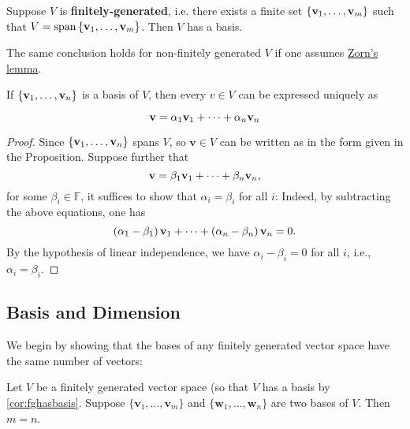 \begin{corollary} \label{cor:fghasbasis}
Suppose \(V\) is {\bf finitely-generated}, i.e. there exists a finite set $\{{\bf v}_1,\ldots ,{\bf v}_{m}\}$ such that $V = \operatorname{span}\left\{{\bf v}_1,\ldots ,{\bf v}_{m}\right\}$.
Then \(V\) has a basis. 
\end{corollary}
The same conclusion holds for non-finitely generated \(V\) if one assumes \href{https://en.wikipedia.org/wiki/Zorn%27s_lemma}{Zorn's lemma}.


\begin{proposition} If \(\left\{  {{\bf v}_1,\ldots ,{\bf v}_n}\right\}\) is a basis of \(V\), then every \(v \in  V\) can be expressed uniquely as

\[
\mathbf{v} = \alpha_1{\bf v}_1 + \cdots  + \alpha_n{\bf v}_n
\]
\end{proposition}

\begin{proof} Since \(\left\{  {{\bf v}_1,\ldots ,{\bf v}_n}\right\}\) spans \(V\), so \(\mathbf{v} \in  V\) can be written as in the form given in the Proposition.
Suppose further that
\[
\mathbf{v} = \beta_1{\bf v}_1 + \cdots  + \beta_n{\bf v}_n,
\]
for some $\beta_i \in \mathbb{F}$, it suffices to show that \(\alpha_{i} = \beta_{i}\) for all \(i\): Indeed, by subtracting the above equations, one has
\[
\left( {\alpha_1 - \beta_1}\right) {\bf v}_1 + \cdots  + \left( {\alpha_n - \beta_n}\right) {\bf v}_n = 0.
\]
By the hypothesis of linear independence, we have \(\alpha_{i} - \beta_{i} = 0\) for all \(i\), i.e., \(\alpha_{i} = \beta_{i}\).
\end{proof}

\subsection{Basis and Dimension}

We begin by showing that the bases of any finitely generated vector space have the same number of vectors:

\begin{theorem} \label{thm:basisdim}
Let $V$ be a finitely generated vector space (so that $V$ has a basis by \autoref{cor:fghasbasis}. Suppose $\{ \mathbf{v}_1,\ldots, \mathbf{v}_{m} \}$ and $\{ \mathbf{w}_1,\ldots, \mathbf{w}_n \}$ are two bases of $V$. Then $m = n$.
\end{theorem}

